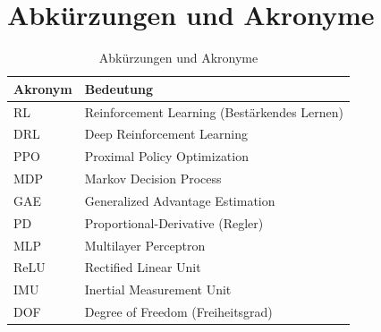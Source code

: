\section{Abkürzungen und Akronyme}

\begin{table}[htbp]
	\centering
	\begin{tabular}{ll}
		\toprule
		\textbf{Akronym} & \textbf{Bedeutung} \\
		\midrule
		RL & Reinforcement Learning (Bestärkendes Lernen) \\
		DRL & Deep Reinforcement Learning \\
		PPO & Proximal Policy Optimization \\
		MDP & Markov Decision Process \\
		GAE & Generalized Advantage Estimation \\
		PD & Proportional-Derivative (Regler) \\
		MLP & Multilayer Perceptron \\
		ReLU & Rectified Linear Unit \\
		IMU & Inertial Measurement Unit \\
		DOF & Degree of Freedom (Freiheitsgrad) \\
		\bottomrule
	\end{tabular}
	\caption{Abkürzungen und Akronyme}
	\label{tab:symbols_acronyms}
\end{table}

